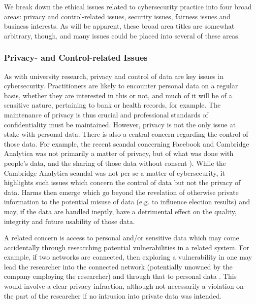 \documentclass{svjour3}                     %
\begin{document}
We break down the ethical issues related to cybersecurity practice into four broad areas: privacy and control-related issues, security issues, fairness issues and business interests. As will be apparent, these broad area titles are somewhat arbitrary, though, and many issues could be placed into several of these areas.

\subsubsection{Privacy- and Control-related Issues}
As with university research, privacy and control of data are key issues in cybersecurity. Practitioners are likely to encounter personal data on a regular basis, whether they are interested in this or not, and much of it will be of a sensitive nature, pertaining to bank or health records, for example.  The maintenance of privacy is thus crucial and professional standards of confidentiality must be maintained. However, privacy is not the only issue at stake with personal data. There is also a central concern regarding the control of those data. For example, the recent scandal concerning Facebook and Cambridge Analytica was not primarily a matter of privacy, but of what was done with people’s data, and the sharing of those data without consent \cite{ienca2018cambridge}). While the Cambridge Analytica scandal was not per se a matter of cybersecurity, it highlights such issues which concern the control of data but not the privacy of data. Harms then emerge which go beyond the revelation of otherwise private information to the potential misuse of data (e.g. to influence election results) and may, if the data are handled ineptly, have a detrimental effect on the quality, integrity and future usability of those data.

A related concern is access to personal and/or sensitive data which may come accidentally through researching potential vulnerabilities in a related system. For example, if two networks are connected, then exploring a vulnerability in one may lead the researcher into the connected network (potentially unowned by the company employing the researcher) and through that to personal data \cite[p.~124]{robinson2011ethical}. This would involve a clear privacy infraction, although not necessarily a violation on the part of the researcher if no intrusion into private data was intended.
\end{document}
